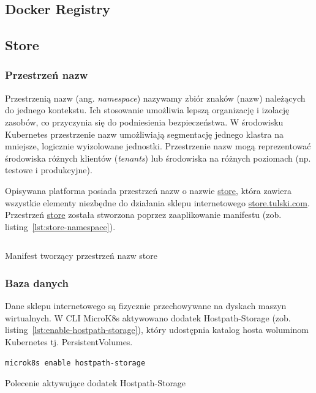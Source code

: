 \subsection{Docker Registry}\label{subsec:docker-registry}


\subsection{Store}\label{subsec:store}

\subsubsection{Przestrzeń nazw}

Przestrzenią nazw (ang. \emph{namespace}) nazywamy zbiór znaków (nazw) należących do jednego kontekstu.
Ich stosowanie umożliwia lepszą organizację i izolację zasobów, co przyczynia się do podniesienia bezpieczeństwa.
W środowisku Kubernetes przestrzenie nazw umożliwiają segmentację jednego klastra na mniejsze, logicznie wyizolowane jednostki.
Przestrzenie nazw mogą reprezentować środowiska różnych klientów (\emph{tenants}) lub środowiska na różnych poziomach (np. testowe i produkcyjne).

Opisywana platforma posiada przestrzeń nazw o nazwie \url{store}, która zawiera wszystkie elementy niezbędne do działania sklepu internetowego \url{store.tulski.com}.
Przestrzeń \url{store} została stworzona poprzez zaaplikowanie manifestu (zob. listing~\ref{lst:store-namespace}).

\begin{listing}[H]
    \inputminted[xleftmargin=20pt,linenos]{yaml}{code/store-namespace.yaml}
    \caption{Manifest tworzący przestrzeń nazw store}
    \label{lst:store-namespace}
\end{listing}

\subsubsection{Baza danych}\label{subsubsec:baza-danych}

Dane sklepu internetowego są fizycznie przechowywane na dyskach maszyn wirtualnych.
W CLI MicroK8s aktywowano dodatek Hostpath-Storage (zob. listing~\ref{lst:enable-hostpath-storage}), który udostępnia katalog hosta woluminom Kubernetes tj. PersistentVolumes.

\begin{listing}[H]
    \begin{verbatim}
microk8s enable hostpath-storage
    \end{verbatim}
    \caption{Polecenie aktywujące dodatek Hostpath-Storage}
    \label{lst:enable-hostpath-storage}
\end{listing}

